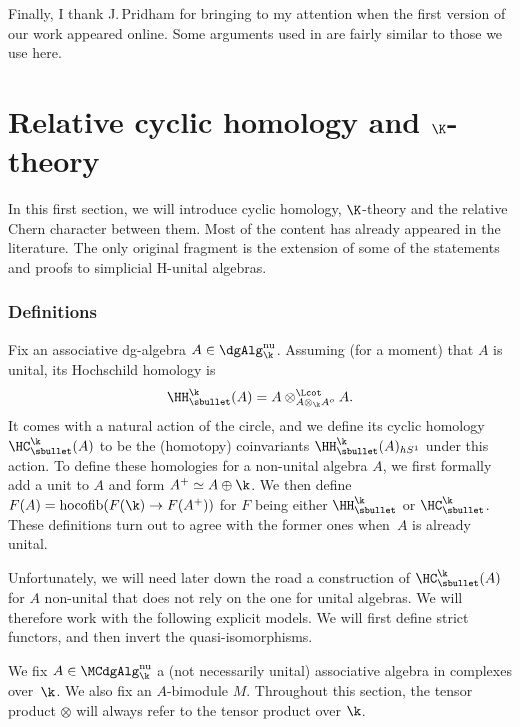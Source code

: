 Finally, I thank J.\,Pridham for bringing \cite{pridham:smoothfunctions} to my attention when the first version of our work appeared online. Some arguments used in \cite{pridham:smoothfunctions} are fairly similar to those we use here.

\section{Relative cyclic homology and \texorpdfstring{$\K$}{K}-theory}

In this first section, we will introduce cyclic homology, $\K$-theory and the relative Chern character between them. Most of the content has already appeared in the literature.
The only original fragment is the extension of some of the statements and proofs to simplicial H-unital algebras.

\label{subsec:cyclic}

\subsubsection{Definitions}
Fix an associative dg-algebra $A \in \dgAlg^\mathrm{nu}_\k$. Assuming (for a moment) that $A$ is unital, its Hochschild homology is
\[
\HH_\sbullet^\k(A) = A \otimes^{\Lcot}_{A \otimes_\k A^o} A.
\]
It comes with a natural action of the circle, and we define its cyclic homology $\HC_\sbullet^\k(A)$ to be the (homotopy) coinvariants $\HH_\sbullet^\k(A)_{hS^1}$ under this action.
To define these homologies for a non-unital algebra $A$, we first formally add a unit to $A$ and form $A^+ \simeq A \oplus \k$. We then define $F(A) = \operatorname{hocofib}(F(\k) \to F(A^+))$ for $F$ being either $\HH_\sbullet^\k$ or $\HC_\sbullet^\k$. These definitions turn out to agree with the former ones when~$A$ is already unital.

Unfortunately, we will need later down the road a construction of $\HC_\sbullet^\k(A)$ for $A$ non-unital that does not rely on the one for unital algebras. We will therefore work with the following explicit models. We will first define strict functors, and then invert the quasi-isomorphisms.

We fix $A \in \MCdgAlg_\k^{\mathrm{nu}}$ a (not necessarily unital) associative algebra in complexes over~$\k$. We also fix an $A$-bimodule $M$.
Throughout this section, the tensor product $\otimes$ will always refer to the tensor product over $\k$.

